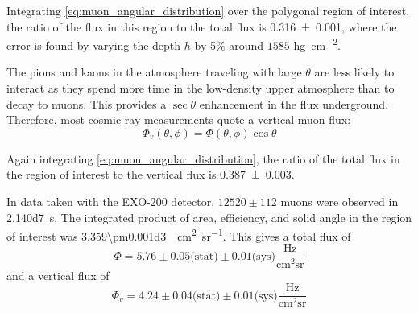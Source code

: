\documentclass[herrin-thesis.tex]{subfiles}
\begin{document}
Integrating \cref{eq:muon_angular_distribution} over the polygonal region of interest, the ratio of the flux in this region to the total flux is \num{0.316\pm0.001}, where the error is found by varying the depth \(h\) by 5\% around \(1585\) \si{\hecto\gram\per\square\centi\meter}.

The pions and kaons in the atmosphere traveling with large \(\theta\) are less likely to interact as they spend more time in the low-density upper atmosphere than to decay to muons. This provides a \(\sec\theta\) enhancement in the flux underground. Therefore, most cosmic ray measurements quote a vertical muon flux:
\begin{equation}
\label{eq:muon_vfluxdef}
\Phi_v(\theta, \phi) = \Phi(\theta, \phi)\cos\theta
\end{equation}

Again integrating \cref{eq:muon_angular_distribution}, the ratio of the total flux in the region of interest to the vertical flux is \num{0.387\pm0.003}.

In data taken with the EXO-200 detector, \(12520\pm112\) muons were observed in \SI{2.140d7}{\second}. The integrated product of area, efficiency, and solid angle in the region of interest was \SI{3.359\pm0.001d3}{\per\square\centi\meter\per\steradian}. This gives a total flux of
\begin{equation}
\label{eq:muon_flux_result}
\Phi = 5.76\pm0.05\text{(stat)}\pm0.01\text{(sys)}\frac{\text{Hz}}{\text{cm}^2\text{sr}}
\end{equation}
and a vertical flux of
\begin{equation}
\label{eq:muon_vflux_result}
\Phi_v = 4.24\pm0.04\text{(stat)}\pm0.01\text{(sys)}\frac{\text{Hz}}{\text{cm}^2\text{sr}}
\end{equation}
\end{document}
